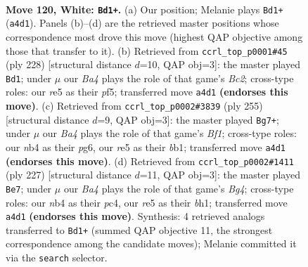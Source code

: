 \documentclass[11pt]{article}
\begin{document}
\clearpage

\begin{figure}[p]\centering
\begin{subfigure}{0.46\textwidth}\centering
\resizebox{\linewidth}{!}{%
\newchessgame
\chessboard[
  setfen={8/8/8/4r1pk/Bn6/6K1/8/8 w - - 24 120},
  showmover=false,
  pgfstyle=straightmove, color=movearrow, markmove={a4-d1}
]}
\caption{}
\end{subfigure}\hfill
\begin{subfigure}{0.46\textwidth}\centering
\resizebox{\linewidth}{!}{%
\newchessgame
\chessboard[
  setfen={8/8/8/5pk1/2n2p2/8/2B2K2/8 w - - 40 115},
  showmover=false,
  pgfstyle=straightmove, color=movearrow, markmove={c2-d1}
]}
\caption{}
\end{subfigure}
\\[4pt]
\begin{subfigure}{0.46\textwidth}\centering
\resizebox{\linewidth}{!}{%
\newchessgame
\chessboard[
  setfen={5b2/3k4/6P1/3PK3/8/8/8/1B6 b - - 16 128},
  showmover=false,
  pgfstyle=straightmove, color=movearrow, markmove={f8-g7}
]}
\caption{}
\end{subfigure}\hfill
\begin{subfigure}{0.46\textwidth}\centering
\resizebox{\linewidth}{!}{%
\newchessgame
\chessboard[
  setfen={8/8/1k6/6b1/KPP5/8/8/7B b - - 68 114},
  showmover=false,
  pgfstyle=straightmove, color=movearrow, markmove={g5-e7}
]}
\caption{}
\end{subfigure}
\caption{\textbf{Move 120, White: \texttt{Bd1+}.} (a) Our position; Melanie plays \texttt{Bd1+} (\texttt{a4d1}). Panels (b)--(d) are the retrieved master positions whose correspondence most drove this move (highest QAP objective among those that transfer to it). (b) Retrieved from \texttt{ccrl\_top\_p0001\#45} (ply 228) [structural distance $d$=10, QAP obj=3]: the master played \texttt{Bd1}; under $\mu$ our \emph{Ba4} plays the role of that game's \emph{Bc2}; cross-type roles: our \emph{r}e5 as their \emph{p}f5; transferred move \texttt{a4d1} \textbf{(endorses this move)}. (c) Retrieved from \texttt{ccrl\_top\_p0002\#3839} (ply 255) [structural distance $d$=9, QAP obj=3]: the master played \texttt{Bg7+}; under $\mu$ our \emph{Ba4} plays the role of that game's \emph{Bf1}; cross-type roles: our \emph{n}b4 as their \emph{p}g6, our \emph{r}e5 as their \emph{b}b1; transferred move \texttt{a4d1} \textbf{(endorses this move)}. (d) Retrieved from \texttt{ccrl\_top\_p0002\#1411} (ply 227) [structural distance $d$=11, QAP obj=3]: the master played \texttt{Be7}; under $\mu$ our \emph{Ba4} plays the role of that game's \emph{Bg4}; cross-type roles: our \emph{n}b4 as their \emph{p}c4, our \emph{r}e5 as their \emph{b}h1; transferred move \texttt{a4d1} \textbf{(endorses this move)}. Synthesis: 4 retrieved analogs transferred to \texttt{Bd1+} (summed QAP objective 11, the strongest correspondence among the candidate moves); Melanie committed it via the \texttt{search} selector.}
\label{fig:thought-m238}
\end{figure}
\end{document}
